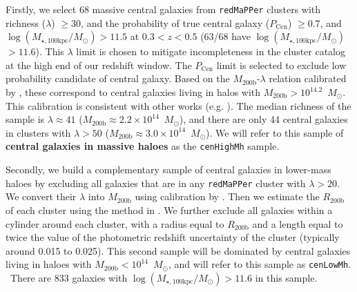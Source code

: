 \documentclass[a4paper,fleqn,usenatbib]{mnras}
\def\msun{$M_\odot$}
\def\redm{\texttt{redMaPPer}}
\def\rbcg{\texttt{cenHighMh}}
\def\nbcg{\texttt{cenLowMh}}
\def\mstar{{$M_{\star}$}}
\def\mhalo{{$M_{\mathrm{200b}}$}}
\def\logmtot{{$\log (M_{\star,100\mathrm{kpc}}/M_{\odot})$}}
\newcommand{\alexie}[1]{\textcolor{blue}{\textbf{[Alexie: #1]}}}
\begin{document}
 
    Firstly, we select 68 massive central galaxies from \redm{} clusters 
    with richness ($\lambda$) $\geq 30$, and the probability of true central galaxy 
    ($P_{\mathrm{Cen}}$) $\geq 0.7$, and \logmtot{}$>11.5$ 
    at $0.3 < z < 0.5$ (63/68 have \logmtot{}$>11.6$). 
    This $\lambda$ limit is chosen to mitigate incompleteness in the cluster catalog
    at the high end of our redshift window. 
    The $P_{\mathrm{Cen}}$ limit is selected to exclude low probability candidate of 
    central galaxy. 
    Based on the \mhalo{}-$\lambda$ relation calibrated by \citet{Simet2016}, these 
    correspond to central galaxies living in halos with \mhalo{}$>10^{14.2}$~\msun{}. 
    This calibration is consistent with other works (e.g. \citealt{Saro2015, Farahi2016, 
    Melchior2016, Murata2017}). 
    The median richness of the sample is $\lambda \approx 41$ 
    (\mhalo{}$\approx 2.2 \times 10^{14}$~\msun{}), and there are 
    only 44 central galaxies in clusters with $\lambda>50$ 
    (\mhalo{}$\approx 3.0 \times 10^{14}$~\msun{}).
    We will refer to this sample of \textbf{central galaxies in massive haloes} as 
    the \rbcg{} sample.
    
    Secondly, we build a complementary sample of central galaxies in lower-mass haloes
    by excluding all galaxies that are in any \redm{} cluster with $\lambda > 20$.
    We convert their $\lambda$ into $M_{\mathrm{200b}}$ using calibration by 
    \citet{Simet2016}. 
    Then we estimate the $R_{\mathrm{200b}}$ of each cluster using the method in 
    \citet{Diemer2015}. 
    We further exclude all galaxies within a cylinder around each cluster, with a radius
    equal to $R_{\mathrm{200b}}$ and a length equal to twice the value of the 
    photometric redshift uncertainty of the cluster (typically around 0.015 to 0.025).
    This second sample will be dominated by central galaxies living in haloes with
    $M_{\mathrm{200b}} < 10^{14}$~\msun{}, and will refer to this sample as \nbcg{}. \
    There are 833 galaxies with \logmtot{}$> 11.6$ in this sample.

\end{document}
